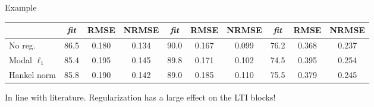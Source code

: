 \documentclass{beamer}
\begin{document}
\begin{frame}{Example}
\begin{table}[ht]
{\begin{tabular}{@{}l*{9}{c}@{}}
\cmidrule(lr){2-4} \cmidrule(lr){5-7} \cmidrule(lr){8-10}
& {\emph{fit}} & {RMSE} & {NRMSE} & {\emph{fit}} & {RMSE} & {NRMSE} & {\emph{fit}} & {RMSE} & {NRMSE} \\
\midrule
No reg. & 86.5 & 0.180 & 0.134 & 90.0 & 0.167 & 0.099  & 76.2 & 0.368 & 0.237 \\
Modal $\ell_1$ & 85.4 & 0.195 & 0.145 & 89.8 & 0.171 & 0.102 & 74.5 & 0.395 & 0.254 \\
Hankel norm & 85.8 & 0.190 & 0.142 & 89.0 & 0.185 & 0.110 & 75.5 & 0.379 & 0.245 \\
\bottomrule
\end{tabular}
}
\end{table}
\pause
In line with literature. Regularization has a large effect on the LTI blocks!
\end{frame}
\end{document}

